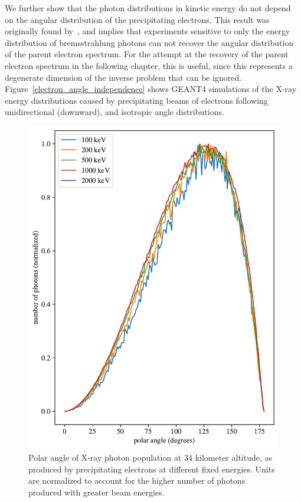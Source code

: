 We further show that the photon distributions in kinetic energy do not depend on the angular distribution of the precipitating electrons. This result was originally found by~\citet{Rees1963}, and implies that experiments sensitive to only the energy distribution of bremsstrahlung photons can not recover the angular distribution of the parent electron spectrum. For the attempt at the recovery of the parent electron spectrum in the following chapter, this is useful, since this represents a degenerate dimension of the inverse problem that can be ignored. Figure~\ref{electron_angle_independence} shows GEANT4 simulations of the X-ray energy distributions caused by precipitating beams of electrons following unidirectional (downward), and isotropic angle distributions. 

\begin{figure}[p]
\label{photon_angle_independence}
\includegraphics[width=\textwidth]{figures/chapter_3/photon_angle_independence/photon_angle_independence}
\caption{Polar angle of X-ray photon population at 34 kilometer altitude, as produced by precipitating electrons at different fixed energies. Units are normalized to account for the higher number of photons produced with greater beam energies.}
\end{figure}

